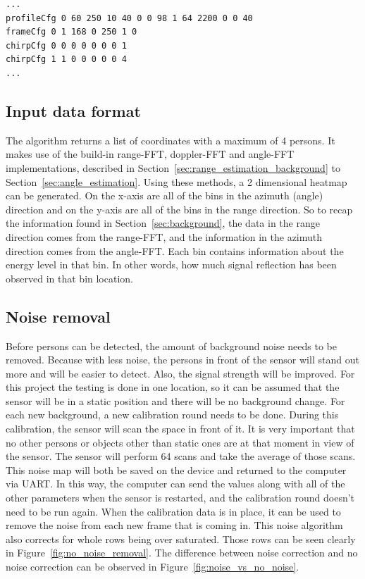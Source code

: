 \begin{lstlisting}[label=lst:parameters, caption=Portion of the parameters file which gets send to the IWR6843 to set it up.]
...
profileCfg 0 60 250 10 40 0 0 98 1 64 2200 0 0 40
frameCfg 0 1 168 0 250 1 0
chirpCfg 0 0 0 0 0 0 0 1
chirpCfg 1 1 0 0 0 0 0 4
...
\end{lstlisting}

\subsection{Input data format}
The algorithm returns a list of coordinates with a maximum of 4 persons. It makes use of the build-in range-FFT, doppler-FFT and angle-FFT implementations, described in Section~\ref{sec:range_estimation_background} to Section~\ref{sec:angle_estimation}. Using these methods, a 2 dimensional heatmap can be generated. On the x-axis are all of the bins in the azimuth (angle) direction and on the y-axis are all of the bins in the range direction. So to recap the information found in Section~\ref{sec:background}, the data in the range direction comes from the range-FFT, and the information in the azimuth direction comes from the angle-FFT. Each bin contains information about the energy level in that bin. In other words, how much signal reflection has been observed in that bin location. 


\subsection{Noise removal}
Before persons can be detected, the amount of background noise needs to be removed. Because with less noise, the persons in front of the sensor will stand out more and will be easier to detect. Also, the signal strength will be improved. For this project the testing is done in one location, so it can be assumed that the sensor will be in a static position and there will be no background change. For each new background, a new calibration round needs to be done. During this calibration, the sensor will scan the space in front of it. It is very important that no other persons or objects other than static ones are at that moment in view of the sensor. The sensor will perform 64 scans and take the average of those scans. This noise map will both be saved on the device and returned to the computer via UART. In this way, the computer can send the values along with all of the other parameters when the sensor is restarted, and the calibration round doesn't need to be run again. When the calibration data is in place, it can be used to remove the noise from each new frame that is coming in. This noise algorithm also corrects for whole rows being over saturated. Those rows can be seen clearly in Figure~\ref{fig:no_noise_removal}. The difference between noise correction and no noise correction can be observed in Figure~\ref{fig:noise_vs_no_noise}.

